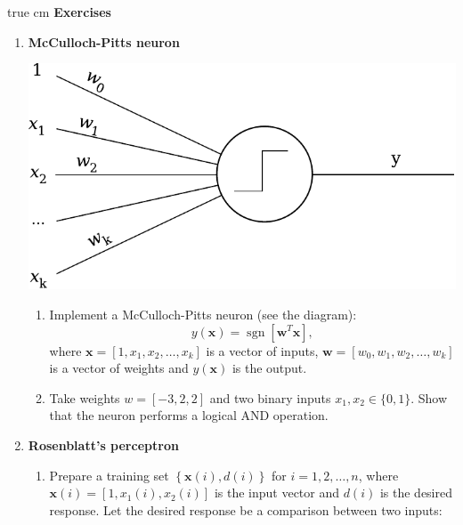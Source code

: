 \documentclass[12pt, a4]{article}
\DeclareMathOperator\sgn{sgn}
\begin{document}
 true cm
{\bf Exercises}
\begin{enumerate}
    \item \textbf{McCulloch-Pitts neuron}

        \begin{center}
               \includegraphics[scale=0.5]{perceptron.pdf}
        \end{center}
        \begin{enumerate}
            \item Implement a McCulloch-Pitts neuron (see the
                diagram):
                \begin{equation*}
                    y(\mathbf{x})=\sgn\left[
                    \mathbf{w}^T\mathbf{x}\right],
                \end{equation*}
                where $\mathbf{x}=[1, x_1, x_2,\dots, x_k]$ is a
                vector of inputs, $\mathbf{w}=[w_0, w_1, w_2, \dots,
                w_k]$ is a vector of weights and $y(\mathbf{x})$ is the
                output.
            \item Take weights $w=[-3, 2, 2]$ and two binary inputs
                $x_1, x_2 \in \{0, 1\}$. Show that the neuron performs a
            logical AND operation.
        \end{enumerate}
    \item \textbf{Rosenblatt's perceptron}
        \begin{enumerate}
            \item Prepare a training set $\left\{\mathbf{x}(i),
                d(i)\right\}$ for $i=1,2,\dots,n$, where
                $\mathbf{x}(i)=[1, x_1(i), x_2(i)]$ is the input
                vector and $d(i)$ is the desired response. Let the
                desired response be a comparison between two inputs:


\end{enumerate}
\end{enumerate}
\end{document}
